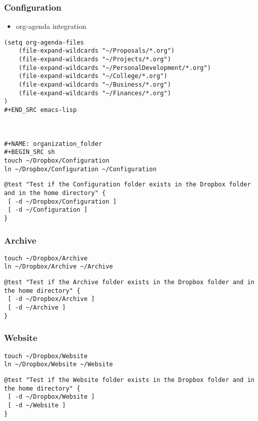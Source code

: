 \documentclass[11pt]{article}
\begin{document}
\subsubsection{Configuration}
\label{sec:org192b5e9}


\begin{itemize}
\item org-agenda integration
\end{itemize}
\begin{verbatim}
(setq org-agenda-files
    (file-expand-wildcards "~/Proposals/*.org")
    (file-expand-wildcards "~/Projects/*.org")
    (file-expand-wildcards "~/PersonalDevelopment/*.org")
    (file-expand-wildcards "~/College/*.org")
    (file-expand-wildcards "~/Business/*.org")
    (file-expand-wildcards "~/Finances/*.org")
)
#+END_SRC emacs-lisp



#+NAME: organization_folder
#+BEGIN_SRC sh
touch ~/Dropbox/Configuration
ln ~/Dropbox/Configuration ~/Configuration
\end{verbatim}

\begin{verbatim}
@test "Test if the Configuration folder exists in the Dropbox folder and in the home directory" {
 [ -d ~/Dropbox/Configuration ]
 [ -d ~/Configuration ]
}
\end{verbatim}

\subsubsection{Archive}
\label{sec:org9597485}
\begin{verbatim}
touch ~/Dropbox/Archive
ln ~/Dropbox/Archive ~/Archive
\end{verbatim}

\begin{verbatim}
@test "Test if the Archive folder exists in the Dropbox folder and in the home directory" {
 [ -d ~/Dropbox/Archive ]
 [ -d ~/Archive ]
}
\end{verbatim}

\subsubsection{Website}
\label{sec:org7ed4daf}
\begin{verbatim}
touch ~/Dropbox/Website
ln ~/Dropbox/Website ~/Website
\end{verbatim}

\begin{verbatim}
@test "Test if the Website folder exists in the Dropbox folder and in the home directory" {
 [ -d ~/Dropbox/Website ]
 [ -d ~/Website ]
}
\end{verbatim}
\end{document}
